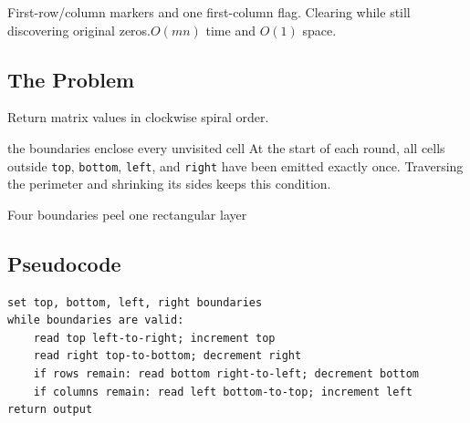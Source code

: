   {First-row/column markers and one first-column flag.}
  {Clearing while still discovering original zeros.}{$O(mn)$ time and $O(1)$ space.}



\subsection{The Problem}
Return matrix values in clockwise spiral order.

\begin{invariantbox}{the boundaries enclose every unvisited cell}
At the start of each round, all cells outside \texttt{top}, \texttt{bottom},
\texttt{left}, and \texttt{right} have been emitted exactly once. Traversing
the perimeter and shrinking its sides keeps this condition.
\end{invariantbox}

\begin{visualbox}{Four boundaries peel one rectangular layer}
\centering
{}
\end{visualbox}

\subsection{Pseudocode}
\begin{lstlisting}[style=pseudocode]
set top, bottom, left, right boundaries
while boundaries are valid:
    read top left-to-right; increment top
    read right top-to-bottom; decrement right
    if rows remain: read bottom right-to-left; decrement bottom
    if columns remain: read left bottom-to-top; increment left
return output
\end{lstlisting}

